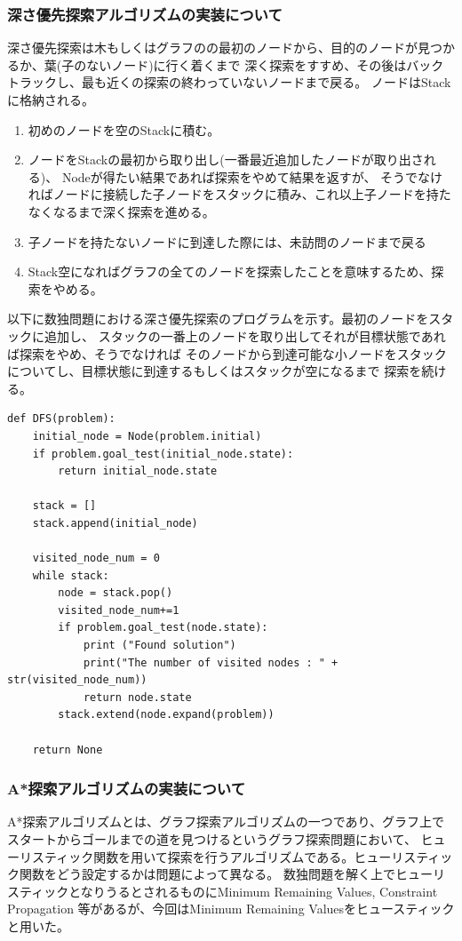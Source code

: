 \documentclass[uplatex]{jsarticle}
\begin{document}
\subsubsection{深さ優先探索アルゴリズムの実装について}
深さ優先探索は木もしくはグラフのの最初のノードから、目的のノードが見つかるか、葉(子のないノード)に行く着くまで
深く探索をすすめ、その後はバックトラックし、最も近くの探索の終わっていないノードまで戻る。
ノードはStackに格納される。
\begin{enumerate}
  \item 初めのノードを空のStackに積む。
  \item ノードをStackの最初から取り出し(一番最近追加したノードが取り出される)、
  Nodeが得たい結果であれば探索をやめて結果を返すが、
  そうでなければノードに接続した子ノードをスタックに積み、これ以上子ノードを持たなくなるまで深く探索を進める。
  \item 子ノードを持たないノードに到達した際には、未訪問のノードまで戻る
  \item Stack空になればグラフの全てのノードを探索したことを意味するため、探索をやめる。
\end{enumerate}

以下に数独問題における深さ優先探索のプログラムを示す。最初のノードをスタックに追加し、
スタックの一番上のノードを取り出してそれが目標状態であれば探索をやめ、そうでなければ
そのノードから到達可能な小ノードをスタックについてし、目標状態に到達するもしくはスタックが空になるまで
探索を続ける。
\begin{lstlisting}[basicstyle=\ttfamily\footnotesize, frame=single]
  def DFS(problem):
  	initial_node = Node(problem.initial)
  	if problem.goal_test(initial_node.state):
  		return initial_node.state

  	stack = []
  	stack.append(initial_node)

  	visited_node_num = 0
  	while stack:
  		node = stack.pop()
  		visited_node_num+=1
  		if problem.goal_test(node.state):
  			print ("Found solution")
  			print("The number of visited nodes : " + str(visited_node_num))
  			return node.state
  		stack.extend(node.expand(problem))

  	return None
\end{lstlisting}

\subsubsection{A*探索アルゴリズムの実装について}
A*探索アルゴリズムとは、グラフ探索アルゴリズムの一つであり、グラフ上でスタートからゴールまでの道を見つけるというグラフ探索問題において、
ヒューリスティック関数を用いて探索を行うアルゴリズムである。ヒューリスティック関数をどう設定するかは問題によって異なる。
数独問題を解く上でヒューリスティックとなりうるとされるものにMinimum Remaining Values, Constraint Propagation
等があるが、今回はMinimum Remaining Valuesをヒュースティックと用いた。
\end{document}

